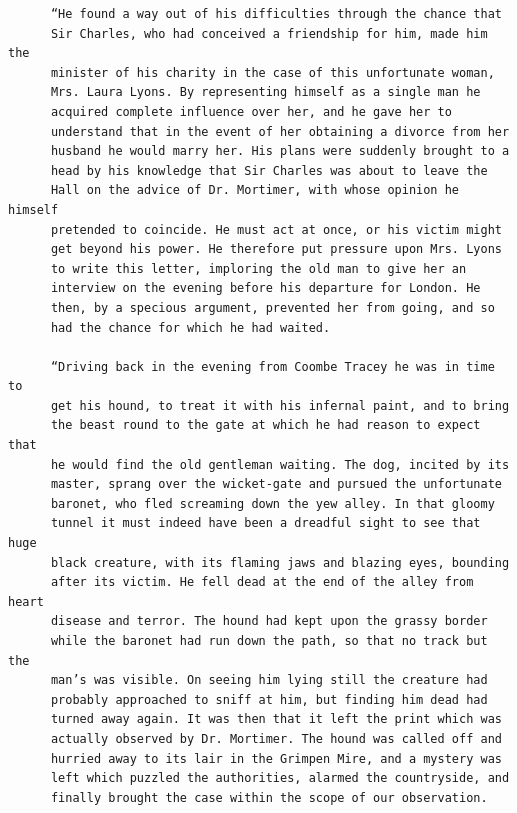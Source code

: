\documentclass{article}
\begin{document}
\begin{verbatim}
      “He found a way out of his difficulties through the chance that
      Sir Charles, who had conceived a friendship for him, made him the
      minister of his charity in the case of this unfortunate woman,
      Mrs. Laura Lyons. By representing himself as a single man he
      acquired complete influence over her, and he gave her to
      understand that in the event of her obtaining a divorce from her
      husband he would marry her. His plans were suddenly brought to a
      head by his knowledge that Sir Charles was about to leave the
      Hall on the advice of Dr. Mortimer, with whose opinion he himself
      pretended to coincide. He must act at once, or his victim might
      get beyond his power. He therefore put pressure upon Mrs. Lyons
      to write this letter, imploring the old man to give her an
      interview on the evening before his departure for London. He
      then, by a specious argument, prevented her from going, and so
      had the chance for which he had waited.

      “Driving back in the evening from Coombe Tracey he was in time to
      get his hound, to treat it with his infernal paint, and to bring
      the beast round to the gate at which he had reason to expect that
      he would find the old gentleman waiting. The dog, incited by its
      master, sprang over the wicket-gate and pursued the unfortunate
      baronet, who fled screaming down the yew alley. In that gloomy
      tunnel it must indeed have been a dreadful sight to see that huge
      black creature, with its flaming jaws and blazing eyes, bounding
      after its victim. He fell dead at the end of the alley from heart
      disease and terror. The hound had kept upon the grassy border
      while the baronet had run down the path, so that no track but the
      man’s was visible. On seeing him lying still the creature had
      probably approached to sniff at him, but finding him dead had
      turned away again. It was then that it left the print which was
      actually observed by Dr. Mortimer. The hound was called off and
      hurried away to its lair in the Grimpen Mire, and a mystery was
      left which puzzled the authorities, alarmed the countryside, and
      finally brought the case within the scope of our observation.


\end{verbatim}
\end{document}
